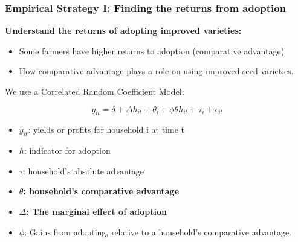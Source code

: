 \documentclass{beamer}
\begin{document}
\begin{frame}
\frametitle{Empirical Strategy I: Finding the returns from adoption}

\textbf{Understand the returns of adopting improved varieties: }
\begin{itemize}
    \item Some farmers have higher returns to adoption (comparative advantage)
    \item How comparative advantage plays a role on using improved seed varieties.
\end{itemize}  


We use a Correlated Random Coefficient Model:
\vspace{-2em}
\begin{center}
$$
    y_{it}= \delta + \Delta h_{it} + \theta_{i} + \phi\theta h_{it} + \tau_{i} + \epsilon_{it}
$$  
\end{center}

\begin{itemize}
    \item $y_{it}$: yields or profits for household i at time t
    \item $h$:  indicator for adoption
    \item $\tau$:  household’s absolute advantage
    \item \textbf{$\theta$: household’s comparative advantage}
    \item \textbf{$\Delta$: The marginal effect of adoption}
    \item $\phi$: Gains from adopting, relative to a household’s comparative advantage.
\end{itemize}

\end{frame}
\end{document}
